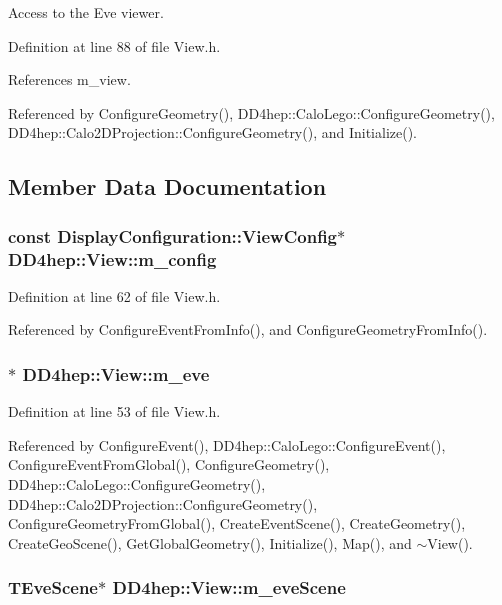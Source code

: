 Access to the Eve viewer. 

Definition at line 88 of file View.h.

References m\_\-view.

Referenced by ConfigureGeometry(), DD4hep::CaloLego::ConfigureGeometry(), DD4hep::Calo2DProjection::ConfigureGeometry(), and Initialize().

\subsection{Member Data Documentation}
\hypertarget{class_d_d4hep_1_1_view_aa661c16c213fd41f49039a8c0e0a96c9}{
\subsubsection[{m\_\-config}]{\setlength{\rightskip}{0pt plus 5cm}const {\bf DisplayConfiguration::ViewConfig}$\ast$ {\bf DD4hep::View::m\_\-config}}}
\label{class_d_d4hep_1_1_view_aa661c16c213fd41f49039a8c0e0a96c9}


Definition at line 62 of file View.h.

Referenced by ConfigureEventFromInfo(), and ConfigureGeometryFromInfo().\hypertarget{class_d_d4hep_1_1_view_a3ec453c7124cf0d8347acd0b0d2febb5}{
\subsubsection[{m\_\-eve}]{$\ast$ {\bf DD4hep::View::m\_\-eve}}}
\label{class_d_d4hep_1_1_view_a3ec453c7124cf0d8347acd0b0d2febb5}


Definition at line 53 of file View.h.

Referenced by ConfigureEvent(), DD4hep::CaloLego::ConfigureEvent(), ConfigureEventFromGlobal(), ConfigureGeometry(), DD4hep::CaloLego::ConfigureGeometry(), DD4hep::Calo2DProjection::ConfigureGeometry(), ConfigureGeometryFromGlobal(), CreateEventScene(), CreateGeometry(), CreateGeoScene(), GetGlobalGeometry(), Initialize(), Map(), and $\sim$View().\hypertarget{class_d_d4hep_1_1_view_ae1010f3e7f65ecc82f47cb160a8839c0}{
\subsubsection[{m\_\-eveScene}]{\setlength{\rightskip}{0pt plus 5cm}TEveScene$\ast$ {\bf DD4hep::View::m\_\-eveScene}}}
\label{class_d_d4hep_1_1_view_ae1010f3e7f65ecc82f47cb160a8839c0}


